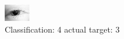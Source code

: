 \begin{figure}[h!]
\begin{center}
\includegraphics[width=0.60\columnwidth]{figures/ID138_class_4_target_3.png}
\end{center}
\caption{ Classification: 4 actual target: 3}
\label{fig:ID138_class_4_target_3}
\end{figure}
